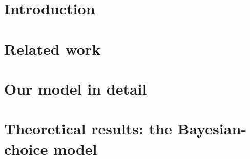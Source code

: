 \documentclass[11pt]{article}
\newcommand{\TheoryModel}{Bayesian-choice model\xspace}
\begin{document}
\newpage
\begin{small}
\setcounter{tocdepth}{2}
\tableofcontents
\end{small}
\setcounter{page}{0}
\thispagestyle{empty}
\newpage

%
%
\section{Introduction}
\label{sec:intro}



\newpage
\section{Related work}
\label{sec:related-work}


\section{Our model in detail}
\label{sec:model}


\newpage
\section{Theoretical results: the \TheoryModel}
\label{sec:theory}

\newpage

%

%

%

%
\end{document}
